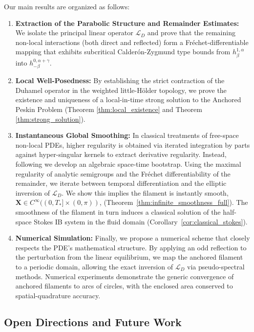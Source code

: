 \documentclass{amsart}
\begin{document}
Our main results are organized as follows:

\begin{enumerate}
    \item \textbf{Extraction of the Parabolic Structure and Remainder Estimates:}
    We isolate the principal linear operator $\mathcal{L}_D$ and prove that the remaining non-local interactions (both direct and reflected) form a Fr\'{e}chet-differentiable mapping that exhibits subcritical Calder\'{o}n-Zygmund type bounds from $h^{1,\alpha}_\beta$ into $h^{0,\alpha+\gamma}_{-\beta}$. 

    \item \textbf{Local Well-Posedness:}
    By establishing the strict contraction of the Duhamel operator in the weighted little-H\"{o}lder topology, we prove the existence and uniqueness of a local-in-time strong solution to the Anchored Peskin Problem (Theorem \ref{thm:local_existence} and Theorem \ref{thm:strong_solution}).

    \item \textbf{Instantaneous Global Smoothing:}
    In classical treatments of free-space non-local PDEs, higher regularity is obtained via iterated integration by parts against hyper-singular kernels to extract derivative regularity. Instead, following \cite{mori2019well} we develop an algebraic space-time bootstrap. Using the maximal regularity of analytic semigroups and the Fr\'{e}chet differentiability of the remainder, we iterate between temporal differentiation and the elliptic inversion of $\mathcal{L}_D$. We show this implies the filament is instantly smooth, $\mathbf{X} \in C^\infty((0,T_*] \times (0,\pi))$, (Theorem~\ref{thm:infinite_smoothness_full}). The smoothness of the filament in turn induces a classical solution of the half-space Stokes IB system in the fluid domain (Corollary~\ref{cor:classical_stokes}).

    \item \textbf{Numerical Simulation:}
    Finally, we propose a numerical scheme that closely respects the PDE's mathematical structure. By applying an odd reflection to the perturbation from the linear equilibrium, we map the anchored filament to a periodic domain, allowing the exact inversion of $\mathcal{L}_D$ via pseudo-spectral methods. Numerical experiments demonstrate the generic convergence of anchored filaments to arcs of circles, with the enclosed area conserved to spatial-quadrature accuracy.
\end{enumerate}

\subsection{Open Directions and Future Work}
\end{document}
